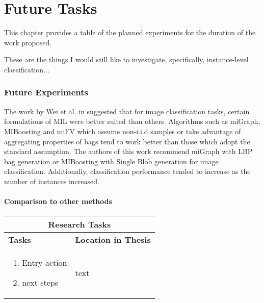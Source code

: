 \chapter{Future Tasks}
This chapter provides a table of the planned experiments for the duration of the work proposed.

These are the things I would still like to investigate, specifically, instance-level classification...

\subsection{Future Experiments}

The work by Wei et al. in \cite{Wei2016ImageBagGenerators} suggested that  for image classification tasks, certain formulations of MIL were better suited than others.  Algorithms such as miGraph, MIBoosting and miFV which assume non-i.i.d samples or take advantage of aggregating properties of bags tend to work better than those which adopt the standard assumption.  The authors of this work recommend miGraph with LBP bag generation or MIBoosting with Single Blob generation for image classification.  Additionally, classification performance tended to increase as the number of instances increased.

\subsubsection{Comparison to other methods}

\begin{table}[H]
	\caption[List of Research Tasks]{List of research tasks and their corresponding locations in the dissertation document.}
	\label{tab:future_tasks}
	\begin{longtable}{ |p{8cm}|p{6cm}|  } 
		\hline
		\multicolumn{2}{|c|}{\textbf{Research Tasks}} \\
		\hline
		\hline
		\textbf{Tasks} & \textbf{Location in Thesis} \\
		\hline
		\begin{enumerate}
			\item Entry action
			\item next steps
		\end{enumerate} & text\\
		\hline
	\end{longtable}
\end{table}